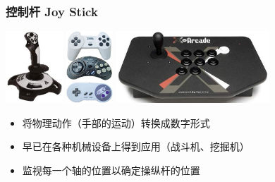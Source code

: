 \documentclass{beamer}
\begin{document}
\begin{frame}
	\frametitle{控制杆 Joy Stick}
	\transwipe
	\begin{center}
	\includegraphics[height=2.7cm]{images/joystick1.jpg}\pause
	\includegraphics[height=2.7cm]{images/joystick2.jpg}\pause
	\includegraphics[height=2.7cm]{images/x-arcade_solo_joystick_640.jpg}\pause
	\end{center}
	\begin{itemize}
		\item 将物理动作（手部的运动）转换成数字形式
		\item 早已在各种机械设备上得到应用（战斗机、挖掘机）
		\item 监视每一个轴的位置以确定操纵杆的位置
	\end{itemize}
\end{frame}
\end{document}

